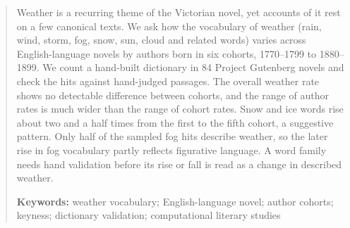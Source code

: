 \begin{abstract}
\noindent
Weather is a recurring theme of the Victorian novel, yet accounts of it rest on a few canonical texts. We ask how the vocabulary of weather (rain, wind, storm, fog, snow, sun, cloud and related words) varies across English-language novels by authors born in six cohorts, 1770--1799 to 1880--1899. We count a hand-built dictionary in 84 Project Gutenberg novels and check the hits against hand-judged passages.
The overall weather rate shows no detectable difference between cohorts, and the range of author rates is much wider than the range of cohort rates.
Snow and ice words rise about two and a half times from the first to the fifth cohort, a suggestive pattern.
Only half of the sampled fog hits describe weather, so the later rise in fog vocabulary partly reflects figurative language.
A word family needs hand validation before its rise or fall is read as a change in described weather.

\medskip
\noindent\textbf{Keywords:} weather vocabulary; English-language novel; author cohorts; keyness; dictionary validation; computational literary studies
\end{abstract}
